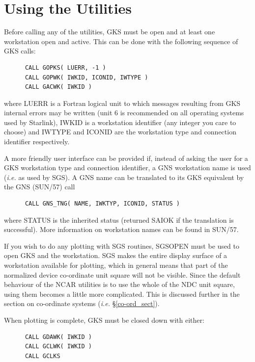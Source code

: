 \documentclass[twoside,11pt]{article}
\newcommand{\xref}[3]{#1}
\newcommand{\xlabel}[1]{}
\renewcommand{\_}{\texttt{\symbol{95}}}
\begin{document}
\section{\xlabel{using_the_utilities}Using the Utilities}

Before calling any of the utilities, GKS must be open and at least one
workstation open and active. 
This can be done with the following sequence of GKS calls:

\begin{verbatim}
      CALL GOPKS( LUERR, -1 )
      CALL GOPWK( IWKID, ICONID, IWTYPE )
      CALL GACWK( IWKID )
\end{verbatim}

where LUERR is a Fortran logical unit to which messages resulting from
GKS internal errors may be written (unit 6 is recommended on all operating
systems used by Starlink), IWKID is a workstation identifier (any integer you
care to choose) and IWTYPE and ICONID are the workstation type and connection
identifier respectively.

A more friendly user interface can be provided if, instead of asking the
user for a GKS workstation type and connection identifier, a GNS workstation
name is used (\emph{i.e.} as used by SGS).
A GNS name can be translated to its GKS equivalent by the GNS (\xref{SUN/57}{sun57}{}) call

\begin{verbatim}
      CALL GNS_TNG( NAME, IWKTYP, ICONID, STATUS )
\end{verbatim}

where STATUS is the inherited status (returned SAI\_\_OK if the translation is 
successful). 
More information on workstation names can be found in \xref{SUN/57}{sun57}{}.

If you wish to do any plotting with SGS routines, SGS\_OPEN must be used to
open GKS and the workstation.
SGS makes the entire display surface of a workstation available for plotting,
which in general means that part of the normalized device co-ordinate unit
square will not be visible.
Since the default behaviour of the NCAR utilities is to use the whole of the
NDC unit square, using them becomes a little more complicated.
This is discussed further in the section on co-ordinate systems
(\emph{i.e.} \S\ref{co-ord_sect}).

When plotting is complete, GKS must be closed down with either:

\begin{verbatim}
      CALL GDAWK( IWKID )
      CALL GCLWK( IWKID )
      CALL GCLKS
\end{verbatim}
\end{document}
